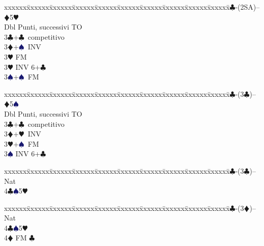 \documentclass[a4paper,italian]{article}
\newcommand{\BC}{\textcolor{OliveGreen}{$\clubsuit$}}
\newcommand{\BD}{\textcolor{RedOrange}{$\vardiamondsuit$}}
\newcommand{\BH}{\textcolor{Red2}{$\varheartsuit${}}}
\newcommand{\BS}{\textcolor{MidnightBlue}{$\spadesuit${}}}
\newenvironment{bidtable}
{\begin{tabbing}

    xxxxxx\=xxxxxx\=xxxxxx\=xxxxxx\=xxxxxx\=xxxxxx\=xxxxxx\=xxxxxx\=xxxxxx\=xxxxxx\=\kill}
{\end{tabbing} }%
\begin{document}
\begin{multicols}{2}
\begin{bidtable}
                                            1\BC-(2SA)-- \> \BD 5\BH \+\\
                                            Dbl \> Punti, successivi TO\\
                                            3\BC {}+\BC\ competitivo\\
                                            3\BD {}+\BS\ INV\+\\
                                            3\BH \> FM\-\\
                                            3\BH \> INV 6+\BC \\
                                            3\BS {}+\BS\ FM\-
                                        \end{bidtable}
                                        \begin{bidtable}
                                            1\BC-(3\BC)-- \> \BD 5\BS \+\\
                                            Dbl \> Punti, successivi TO\\
                                            3\BC {}+\BC\ competitivo\\
                                            3\BD {}+\BH\ INV\\
                                            3\BH {}+\BS\ FM\\
                                            3\BS \> INV 6+\BC \-
                                        \end{bidtable}
                                        \begin{bidtable}
                                            1\BC-(3\BC)-- \> \> Nat\+\\
                                            4\BC {}\BS 5\BH \-
                                        \end{bidtable}
                                        \begin{bidtable}
                                            1\BC-(3\BD)-- \> \> Nat\+\\
                                            4\BC {}\BS 5\BH \\
                                            4\BD \> FM \BC \-
                                        \end{bidtable}


\end{multicols}
\end{document}
